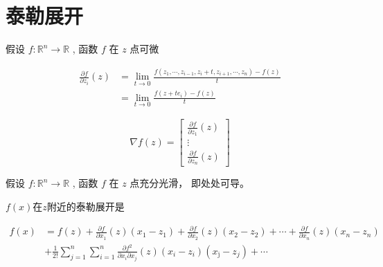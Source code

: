 \section{泰勒展开}

\begin{definition}[函数$f$第$i$个分量的一阶偏导数]
    假设 $ f: \mathbb{R}^{n} \rightarrow \mathbb{R} $ , 函数 $ f $ 在 $ z $ 点可微

    \begin{equation} \begin{aligned} \frac{\partial f}{\partial z_{i}}(z) &=\lim _{t \rightarrow 0} \frac{f\left(z_{1}, \cdots, z_{i-1}, z_{i}+t, z_{i+1}, \cdots, z_{n}\right)-f(z)}{t} \\ &=\lim _{t \rightarrow 0} \frac{f\left(z+t e_{i}\right)-f(z)}{t} \end{aligned} \end{equation}
\end{definition}

\begin{definition}[$f$在点$z$的梯度]
    \begin{equation} \nabla f(z)=\left[\begin{array}{c}\frac{\partial f}{\partial z_{1}}(z) \\ \vdots \\ \frac{\partial f}{\partial z_{n}}(z)\end{array}\right] \end{equation}
\end{definition}

\begin{definition}
    假设 $ f: \mathbb{R}^{n} \rightarrow \mathbb{R} $ , 函数 $ f $ 在 $ z $ 点充分光滑， 即处处可导。

    $f(x)$在$z$附近的泰勒展开是

    \begin{equation}\begin{aligned} f(x)&=f(z)+\frac{\partial f}{\partial x_{1}}(z)\left(x_{1}-z_{1}\right)+\frac{\partial f}{\partial x_{2}}(z)\left(x_{2}-z_{2}\right)+\cdots+\frac{\partial f}{\partial x_{n}}(z)\left(x_{n}-z_{n}\right) 
    \\ & +\frac{1}{2 !} \sum_{j=1}^{n} \sum_{i=1}^{n} \frac{\partial f^{2}}{\partial x_{i} \partial x_{j}}(z)\left(x_{i}-z_{i}\right)\left(x_{\mathrm{j}}-z_{j}\right)+\cdots \end{aligned}\end{equation}
\end{definition}


